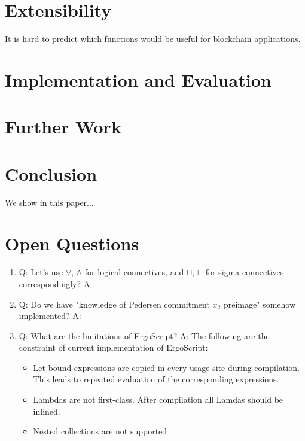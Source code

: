 \documentclass[11pt]{article}
\newcommand{\langname}{ErgoScript\xspace}
\begin{document}
\section{Extensibility}

It is hard to predict which functions would be useful for blockchain applications.

\section{Implementation and Evaluation}

\section{Further Work}

\section{Conclusion}

We show in this paper...









\appendix

\section{Open Questions}

\begin{enumerate}
  \item Q: Let's use $\lor$, $\land$ for logical connectives, and $\sqcup$, $\sqcap$ for
           sigma-connectives correspondingly? \linebreak
        A:
  \item Q: Do we have "knowledge of Pedersen commitment $x_2$ preimage" somehow implemented? \linebreak
        A:
  \item Q: What are the limitations of \langname? \linebreak
        A: The following are the constraint of current implementation of \langname:
        \begin{itemize}
          \item Let bound expressions are copied in every usage site during compilation. This leads to repeated evaluation of the corresponding expressions.
          \item Lambdas are not first-class. After compilation all Lamdas should be inlined.
          \item Nested collections are not supported
        \end{itemize}
\end{enumerate}
\end{document}
